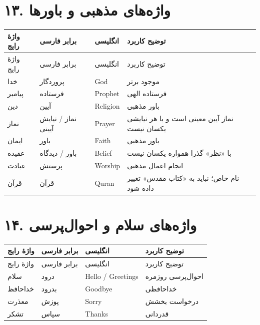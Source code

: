 \documentclass[a4paper,12pt,openany]{book}
\begin{document}
\section*{۱۳. واژه‌های مذهبی و باورها}
\begingroup
\small
\setlength{\tabcolsep}{4pt}
\renewcommand{\arraystretch}{1.25}
\begin{longtable}{|p{2.5cm}|p{4.0cm}|p{2.3cm}|p{5.3cm}|}
\hline
واژهٔ رایج & برابر فارسی & انگلیسی & توضیح کاربرد \\
\hline
\endfirsthead
\hline
واژهٔ رایج & برابر فارسی & انگلیسی & توضیح کاربرد \\
\hline
\endhead
خدا & پروردگار & \textenglish{God} & موجود برتر \\
پیامبر & فرستاده & \textenglish{Prophet} & فرستاده الهی \\
دین & آیین & \textenglish{Religion} & باور مذهبی \\
نماز & نماز / نیایش آیینی & \textenglish{Prayer} & نماز آیین معینی است و با هر نیایشی یکسان نیست \\
ایمان & باور & \textenglish{Faith} & باور مذهبی \\
عقیده & باور / دیدگاه & \textenglish{Belief} & با «نظر» گذرا همواره یکسان نیست \\
عبادت & پرستش & \textenglish{Worship} & انجام اعمال مذهبی \\
قرآن & قرآن & \textenglish{Quran} & نام خاص؛ نباید به «کتاب مقدس» تغییر داده شود \\
\hline
\end{longtable}
\endgroup

\section*{۱۴. واژه‌های سلام و احوال‌پرسی}
\begingroup
\small
\setlength{\tabcolsep}{4pt}
\renewcommand{\arraystretch}{1.25}
\begin{longtable}{|p{2.5cm}|p{4.0cm}|p{2.3cm}|p{5.3cm}|}
\hline
واژهٔ رایج & برابر فارسی & انگلیسی & توضیح کاربرد \\
\hline
\endfirsthead
\hline
واژهٔ رایج & برابر فارسی & انگلیسی & توضیح کاربرد \\
\hline
\endhead
سلام & درود & \textenglish{Hello / Greetings} & احوال‌پرسی روزمره \\
خداحافظ & بدرود & \textenglish{Goodbye} & خداحافظی \\
معذرت & پوزش & \textenglish{Sorry} & درخواست بخشش \\
تشکر & سپاس & \textenglish{Thanks} & قدردانی \\
\hline
\end{longtable}
\endgroup
\end{document}
